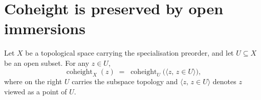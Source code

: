 \section{Coheight is preserved by open immersions}
\label{sec:coheight_topology}


\begin{lemma}

  \label{lem:coheight_eq_of_isOpenEmbedding}
  Let \(X\) be a topological space carrying the specialisation preorder, and
  let \(U \subseteq X\) be an open subset. For any \(z \in U\),
  \[
    \operatorname{coheight}_{X}(z) \;=\; \operatorname{coheight}_{U}\bigl(\langle z, \, z \in U\rangle\bigr),
  \]
  where on the right \(U\) carries the subspace topology and \(\langle z, \,
  z \in U\rangle\) denotes \(z\) viewed as a point of \(U\).
\end{lemma}

